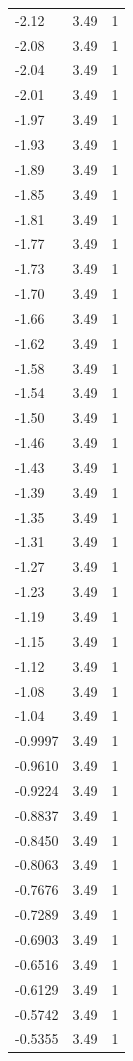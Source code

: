 \begin{longtable}{lrr}
  -2.12 & 3.49 & 1 \\
  -2.08 & 3.49 & 1 \\
  -2.04 & 3.49 & 1 \\
  -2.01 & 3.49 & 1 \\
  -1.97 & 3.49 & 1 \\
  -1.93 & 3.49 & 1 \\
  -1.89 & 3.49 & 1 \\
  -1.85 & 3.49 & 1 \\
  -1.81 & 3.49 & 1 \\
  -1.77 & 3.49 & 1 \\
  -1.73 & 3.49 & 1 \\
  -1.70 & 3.49 & 1 \\
  -1.66 & 3.49 & 1 \\
  -1.62 & 3.49 & 1 \\
  -1.58 & 3.49 & 1 \\
  -1.54 & 3.49 & 1 \\
  -1.50 & 3.49 & 1 \\
  -1.46 & 3.49 & 1 \\
  -1.43 & 3.49 & 1 \\
  -1.39 & 3.49 & 1 \\
  -1.35 & 3.49 & 1 \\
  -1.31 & 3.49 & 1 \\
  -1.27 & 3.49 & 1 \\
  -1.23 & 3.49 & 1 \\
  -1.19 & 3.49 & 1 \\
  -1.15 & 3.49 & 1 \\
  -1.12 & 3.49 & 1 \\
  -1.08 & 3.49 & 1 \\
  -1.04 & 3.49 & 1 \\
  -0.9997 & 3.49 & 1 \\
  -0.9610 & 3.49 & 1 \\
  -0.9224 & 3.49 & 1 \\
  -0.8837 & 3.49 & 1 \\
  -0.8450 & 3.49 & 1 \\
  -0.8063 & 3.49 & 1 \\
  -0.7676 & 3.49 & 1 \\
  -0.7289 & 3.49 & 1 \\
  -0.6903 & 3.49 & 1 \\
  -0.6516 & 3.49 & 1 \\
  -0.6129 & 3.49 & 1 \\
  -0.5742 & 3.49 & 1 \\
  -0.5355 & 3.49 & 1 \\

\end{longtable}
